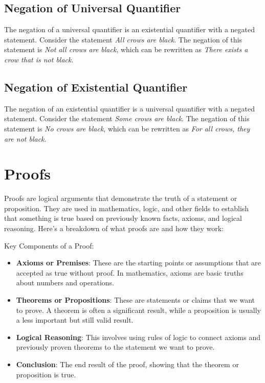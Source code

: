 \documentclass{article}
\theoremstyle{mytheoremstyle}
\theoremstyle{mytheoremstyle}
\theoremstyle{myexamplestyle}
\begin{document}
\subsection{Negation of Universal Quantifier}

The negation of a universal quantifier is an existential quantifier
with a negated statement. Consider the statement \emph{All crows are
    black}. The negation of this statement is \emph{Not all crows
    are black}, which can be rewritten as \emph{There exists a crow that is not black}.

\subsection{Negation of Existential Quantifier}

The negation of an existential quantifier is a universal quantifier
with a negated statement. Consider the statement \emph{Some crows
    are black}. The negation of this statement is \emph{No crows are
    black}, which can be rewritten as \emph{For all crows, they are not black}.

\newpage

\section{Proofs}

Proofs are logical arguments that demonstrate the truth of a
statement or proposition. They are used in mathematics, logic, and
other fields to establish that something is true based on previously
known facts, axioms, and logical reasoning. Here's a breakdown of
what proofs are and how they work:

Key Components of a Proof:
\begin{itemize}
    \item \textbf{Axioms or Premises}: These are the starting points or assumptions that are accepted as true without proof. In mathematics, axioms are basic truths about numbers and operations.
    \item \textbf{Theorems or Propositions}: These are statements or claims that we want to prove. A theorem is often a significant result, while a proposition is usually a less important but still valid result.
    \item \textbf{Logical Reasoning}: This involves using rules of logic to connect axioms and previously proven theorems to the statement we want to prove.
    \item \textbf{Conclusion}: The end result of the proof, showing that the theorem or proposition is true.
\end{itemize}
\end{document}
